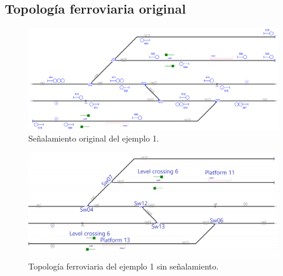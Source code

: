 \subsection{Topología ferroviaria original}

\lipsum[2]


\begin{figure}[H]
	\centering
	\includegraphics[width=1\textwidth]{resultados-obtenidos/ejemplo1/images/1_original.png}
	\centering\caption{Señalamiento original del ejemplo 1.}
\end{figure}

\lipsum[2]

\begin{figure}[h]
	\centering
	\includegraphics[width=1\textwidth]{resultados-obtenidos/ejemplo1/images/1_empty.png}
	\centering\caption{Topología ferroviaria del ejemplo 1 sin señalamiento.}
\end{figure}

\lipsum[2]
